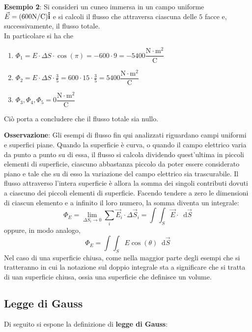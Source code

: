 \documentclass[a4paper]{extarticle}
\newcommand\dif{\mathop{}\!\mathrm{d}}
\begin{document}
\vspace{1em}
\noindent
\textbf{Esempio 2}: Si consideri un cuneo immersa in un campo uniforme $\vec E = (600 \text{N} / \text{C}) \bf{\hat i}$ e si calcoli il flusso che attraversa ciascuna delle $5$ facce e, successivamente, il flusso totale.\\
In particolare si ha che
\begin{enumerate}
  \item $\Phi_1 = E \cdot \Delta S \cdot \cos(\pi) = -600 \cdot 9 = -5400 \dfrac{\text{N} \cdot \text{m}^2}{\text{C}}$
  \item $\Phi_2 = E \cdot \Delta S \cdot \frac{3}{5} = 600 \cdot 15 \cdot \frac{3}{5} = 5400 \dfrac{\text{N} \cdot \text{m}^2}{\text{C}}$
  \item $\Phi_3,\Phi_4,\Phi_5=0\dfrac{\text{N} \cdot \text{m}^2}{\text{C}}$
\end{enumerate}
Ciò porta a concludere che il flusso totale sia nullo.

\vspace{2em}
\noindent
\textbf{Osservazione}: Gli esempi di flusso fin qui analizzati riguardano campi uniformi e superfici piane. Quando la superficie è curva, o quando il campo elettrico varia da punto a punto su di essa, il flusso si calcola dividendo quest'ultima in piccoli elementi di superficie, ciascuno abbastanza piccolo da poter essere considerato piano e tale che su di esso la variazione del campo elettrico sia trascurabile. Il flusso attraverso l'intera superficie è allora la somma dei singoli contributi dovuti a ciascuno dei piccoli elementi di superficie. Facendo tendere a zero le dimensioni di ciascun elemento e a infinito il loro numero, la somma diventa un integrale:
\[\boxed{\Phi_E = \lim_{\Delta S_i \to 0} \sum_i \vec{E}_i \cdot \Delta \vec{S}_i = \int \int_S \vec{E} \cdot \dif \vec{S}}\]
oppure, in modo analogo,
\[\Phi_E = \int \int_S  E \cos(\theta) \dif \vec{S}\]
Nel caso di una superficie chiusa, come nella maggior parte degli esempi che si tratteranno
in cui la notazione sul doppio integrale sta a significare che si tratta di uan superficie chiusa, ossia una superficie che definisce un volume.

\vspace{1em}
\subsection{Legge di Gauss}
Di seguito si espone la definizione di \textbf{legge di Gauss}:
\end{document}

